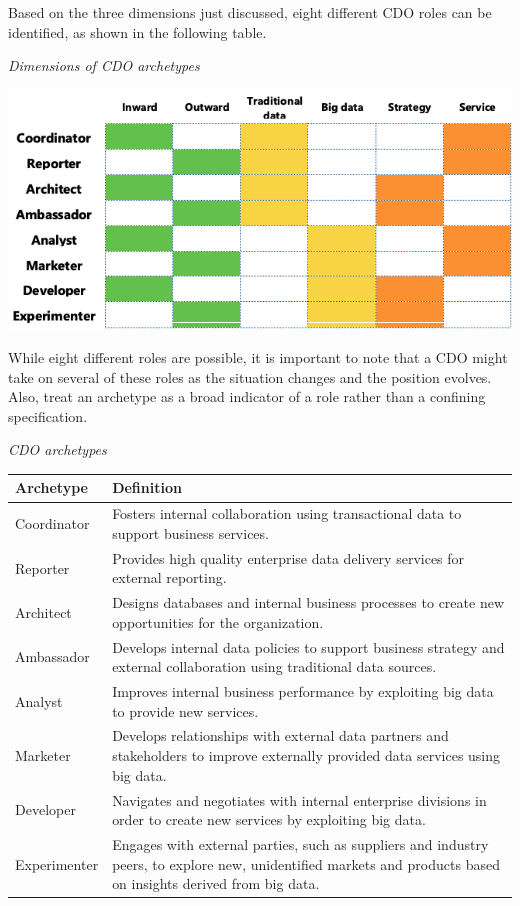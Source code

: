 \documentclass[
]{article}
\begin{document}
Based on the three dimensions just discussed, eight different CDO roles
can be identified, as shown in the following table.

\emph{Dimensions of CDO archetypes}

\includegraphics{Figures/Chapter 24/cdo-archetypes.png}

While eight different roles are possible, it is important to note that a
CDO might take on several of these roles as the situation changes and
the position evolves. Also, treat an archetype as a broad indicator of a
role rather than a confining specification.

\emph{CDO archetypes}

\begin{longtable}[]{@{}
  >{\raggedright\arraybackslash}p{}
  >{\raggedright\arraybackslash}p{}@{}}
\toprule
Archetype & Definition \\
\midrule
\endhead
Coordinator & Fosters internal collaboration using transactional data to support business services. \\
Reporter & Provides high quality enterprise data delivery services for external reporting. \\
Architect & Designs databases and internal business processes to create new opportunities for the organization. \\
Ambassador & Develops internal data policies to support business strategy and external collaboration using traditional data sources. \\
Analyst & Improves internal business performance by exploiting big data to provide new services. \\
Marketer & Develops relationships with external data partners and stakeholders to improve externally provided data services using big data. \\
Developer & Navigates and negotiates with internal enterprise divisions in order to create new services by exploiting big data. \\
Experimenter & Engages with external parties, such as suppliers and industry peers, to explore new, unidentified markets and products based on insights derived from big data. \\
\bottomrule
\end{longtable}
\end{document}
